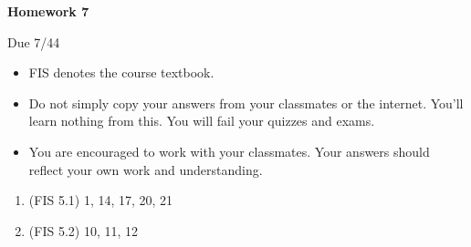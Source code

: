 \documentclass{article}
\begin{document}
\begin{center}
    {\bf Homework 7}
    
    Due 7/44
\end{center}

\begin{itemize}
    \item 
        FIS denotes the course textbook.
    \item
        Do not simply copy your answers from your classmates or the internet.
        You'll learn nothing from this. You will fail your quizzes and exams.
    \item
        You are encouraged to work with your classmates. Your answers
        should reflect your own work and understanding.
\end{itemize}

\begin{enumerate}
    \item
        (FIS 5.1) 1, 14, 17, 20, 21
    \item
        (FIS 5.2) 10, 11, 12
\end{enumerate}
    
\end{document}
